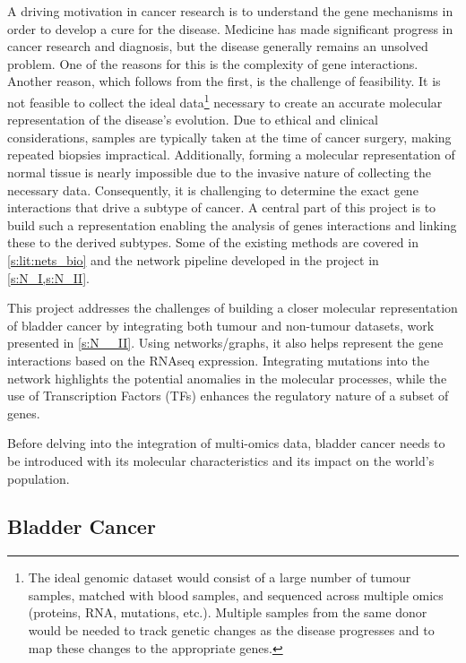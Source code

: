 A driving motivation in cancer research is to understand the gene mechanisms in order to develop a cure for the disease. Medicine has made significant progress in cancer research and diagnosis, but the disease generally remains an unsolved problem. One of the reasons for this is the complexity of gene interactions. Another reason, which follows from the first, is the challenge of feasibility. It is not feasible to collect the ideal data\footnote{The ideal genomic dataset would consist of a large number of tumour samples, matched with blood samples, and sequenced across multiple omics (proteins, RNA, mutations, etc.). Multiple samples from the same donor would be needed to track genetic changes as the disease progresses and to map these changes to the appropriate genes.} necessary to create an accurate molecular representation of the disease's evolution. Due to ethical and clinical considerations, samples are typically taken at the time of cancer surgery, making repeated biopsies impractical. Additionally, forming a molecular representation of normal tissue is nearly impossible due to the invasive nature of collecting the necessary data. Consequently, it is challenging to determine the exact gene interactions that drive a subtype of cancer. A central part of this project is to build such a representation enabling the analysis of genes interactions and linking these to the derived subtypes. Some of the existing methods are covered in \cref{s:lit:nets_bio} and the network pipeline developed in the project in \cref{s:N_I,s:N_II}.

This project addresses the challenges of building a closer molecular representation of bladder cancer by integrating both tumour and non-tumour datasets, work presented in \cref{s:N__II}. Using networks/graphs, it also helps represent the gene interactions based on the RNAseq expression. Integrating mutations into the network highlights the potential anomalies in the molecular processes, while the use of Transcription Factors (TFs) enhances the regulatory nature of a subset of genes.

Before delving into the integration of multi-omics data, bladder cancer needs to be introduced with its molecular characteristics and its impact on the world's population.


\subsection{Bladder Cancer} \label{s:lit:bladder_cancer}

